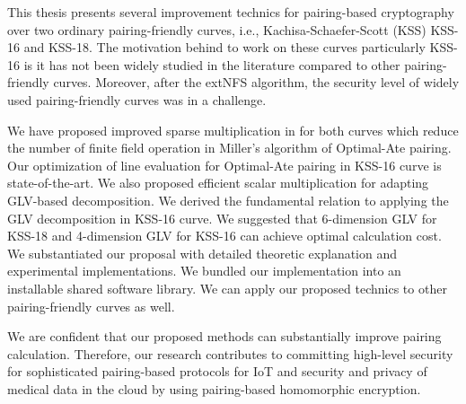 This thesis presents several improvement technics for pairing-based cryptography over two ordinary pairing-friendly curves, i.e., Kachisa-Schaefer-Scott (KSS) KSS-16 and KSS-18.
The motivation behind to work on these curves particularly KSS-16 is it has not been widely studied in the literature compared to other pairing-friendly curves.
Moreover, after the extNFS algorithm, the security level of widely used pairing-friendly curves was in a challenge.

We have proposed improved sparse multiplication in for both curves which reduce the number of finite field operation in Miller's algorithm of Optimal-Ate pairing.
Our optimization of line evaluation for Optimal-Ate pairing in KSS-16 curve is state-of-the-art.
We also proposed efficient scalar multiplication for adapting GLV-based decomposition.
We derived the fundamental relation to applying the GLV decomposition in KSS-16 curve.
We suggested that 6-dimension GLV for KSS-18 and 4-dimension GLV for KSS-16 can achieve optimal calculation cost.
We substantiated our proposal with detailed theoretic explanation and experimental implementations.
We bundled our implementation into an installable shared software library. 
We can apply our proposed technics to other pairing-friendly curves as well.

We are confident that our proposed methods can substantially improve pairing calculation. Therefore, our research contributes to committing high-level security for sophisticated pairing-based protocols for IoT and security and privacy of medical data in the cloud by using pairing-based homomorphic encryption.
